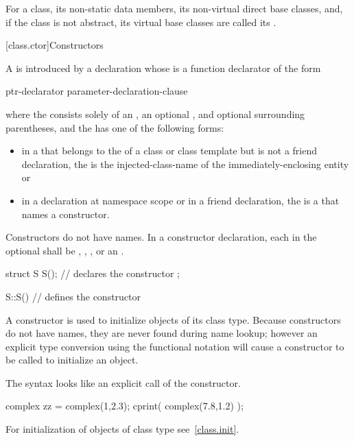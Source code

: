 \pnum
For a class, its non-static data members, its non-virtual direct base classes,
and, if the class is not abstract, its virtual base
classes are called its .

[class.ctor]{Constructors}%
%
%

\pnum
A  is introduced by a declaration
whose  is a
function declarator of the form
\begin{ncbnf}
ptr-declarator \terminal{(} parameter-declaration-clause \terminal{)}  
\end{ncbnf}
where the  consists solely of an
, an optional ,
and optional surrounding parentheses, and the  has
one of the following forms:
\begin{itemize}
\item
in a  that belongs to the
 of a class or class template
but is not a friend
declaration, the  is the
injected-class-name of the immediately-enclosing entity or

\item
in a declaration at namespace scope or in a friend declaration, the
 is a  that names a
constructor.
\end{itemize}
Constructors do not have names.
In a constructor declaration, each  in the optional
 shall be , ,
, or an .
\begin{example}
\begin{codeblock}
struct S {
  S();              // declares the constructor
};

S::S() { }          // defines the constructor
\end{codeblock}
\end{example}

\pnum
{}%
A constructor is used to initialize objects of its class type.
Because constructors do not have names, they are never found during
name lookup; however an explicit type conversion using the functional
notation will cause a constructor to be called to
initialize an object.
\begin{note}
The syntax looks like an explicit call of the constructor.
\end{note}
\begin{example}
\begin{codeblock}
complex zz = complex(1,2.3);
cprint( complex(7.8,1.2) );
\end{codeblock}
\end{example}
\begin{note}
For initialization of objects of class type see~\ref{class.init}.
\end{note}

